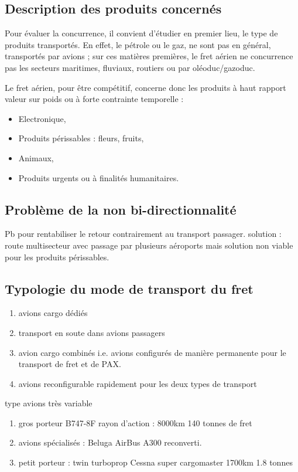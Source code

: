 \subsection{Description des produits concernés}
Pour évaluer la concurrence, il convient d'étudier en premier lieu, le type de produits transportés. En effet, le pétrole ou le gaz, ne sont pas en général, transportés par avions ; sur ces matières premières, le fret aérien ne concurrence pas les secteurs maritimes, fluviaux, routiers ou par oléoduc/gazoduc. 

Le fret aérien, pour être compétitif, concerne donc les produits à haut rapport valeur sur poids ou à forte contrainte temporelle :

\begin{itemize}
	\item Electronique,
	\item Produits périssables : fleurs, fruits, 
	\item Animaux,
	\item Produits urgents ou à finalités humanitaires.
\end{itemize}



\subsection{Problème de la non  bi-directionnalité}
Pb pour rentabiliser le retour contrairement au transport passager.
solution : route multisecteur avec passage par plusieurs aéroports
mais solution non viable pour les produits périssables.





\subsection{Typologie du mode de transport du fret}


\begin{enumerate}
	\item avions cargo dédiés
	\item transport en soute dans avions passagers
	\item avion cargo combinés i.e. avions configurés de manière permanente pour le transport de fret et de PAX.
	\item avions reconfigurable rapidement pour les deux types de transport
\end{enumerate}

type avions très variable

\begin{enumerate}
	\item gros porteur B747-8F rayon d'action : 8000km 140 tonnes de fret
	\item avions spécialisés : Beluga AirBus A300 reconverti.
	\item petit porteur : twin turboprop Cessna super cargomaster 1700km 1.8 tonnes
\end{enumerate}